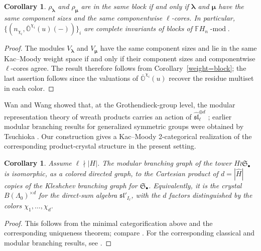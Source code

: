 \documentclass[12pt]{amsart}
\numberwithin{itemcounter}{subsection}
\theoremstyle{plain}
\newtheorem{corollary}[theorem]{Corollary}
\theoremstyle{definition}
\theoremstyle{remark}
\numberwithin{equation}{section}
\def\bbF{\mathbb{F}}
\def\bbO{\mathbb{O}}
\def\fraks{\mathfrak{s}}
\def\frakl{\mathfrak{l}}
\def\frakl{\mathfrak{l}}
\def\mod{\operatorname{-mod}\nolimits}
\newcommand*{\tuple}[1]
{\boldsymbol{#1}}
\begin{document}
										\begin{corollary}

											$\rho_{\tuple \lambda}$ and
											$\rho_{\tuple \mu}$ are in the same block if and only if ${\tuple \lambda}$ and ${\tuple \mu}$ have the same component sizes and the same componentwise $\ell$-cores.
											In particular,
											$\{(n_{\chi_i},\overline{\bbO}^{\chi_i}(u)(-))\}_{i}$ are complete invariants of blocks of $\bbF H _{n}\mod.$
										\end{corollary}
										\begin{proof}
                                            The modules $V_{\tuple \lambda}$ and $V_{\tuple \mu}$ have the same component sizes and lie in the same Kac--Moody weight space if and only if their component sizes and componentwise $\ell$-cores agree. The result therefore follows from Corollary~\ref{weight=block}; the last assertion follows since the valuations of $\overline{\bbO}^{\chi_i}(u)$ recover the residue multiset in each color.
                                        \end{proof}

										Wan and Wang showed that, at the Grothendieck-group level, the modular representation theory of wreath products carries an action of $\widehat{\mathfrak{sl}}_{\ell}^{\oplus d}$ \cite{WW08}; earlier modular branching results for generalized symmetric groups were obtained by Tsuchioka \cite{Tsu07}.  Our construction gives a Kac--Moody 2-categorical realization of the corresponding product-crystal structure in the present setting.

										\begin{corollary}
											Assume $\ell\nmid |H|$. The modular branching graph of the tower
$H\wr\mathfrak S_\bullet$ is isomorphic, as a colored directed graph, to the Cartesian product of
$d=|\widehat H|$ copies of the Kleshchev branching graph for $\mathfrak S_\bullet$. Equivalently, it is the crystal $B(\Lambda_0)^{\times d}$ for the direct-sum algebra $\fraks\frakl'_{I_\ell}$, with the $d$ factors distinguished by the colors $\chi_1,\ldots,\chi_d$.
										\end{corollary}

										\begin{proof}
											This follows from the minimal categorification above and the corresponding uniqueness theorem; compare \cite{R08}.  For the corresponding classical and modular branching results, see \cite{Pus99,MS16,Tsu07,WW08}.
										\end{proof}
\end{document}
